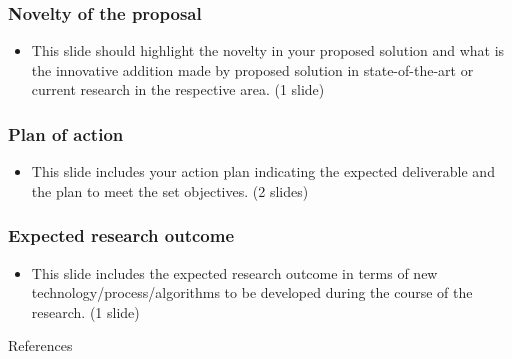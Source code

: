 \documentclass{beamer}
\begin{document}
\begin{frame}\frametitle{Novelty of the proposal}
\begin{itemize}
\item This slide should highlight the novelty in your proposed solution and what is the innovative addition made by proposed solution in state-of-the-art or current research in the respective area. (1 slide)
\end{itemize}
\end{frame}

\begin{frame}\frametitle{Plan of action}
\begin{itemize}
\item This slide includes your action plan indicating the expected deliverable and the plan to meet the set objectives. (2 slides)
\end{itemize}
\end{frame}

\begin{frame}\frametitle{Expected research outcome}
\begin{itemize}
\item This slide includes the expected research outcome in terms of new technology/process/algorithms to be developed during the course of the research. (1 slide)
\end{itemize}
\end{frame}



\begin{frame}[allowframebreaks]{References}

\nocite{*}
\end{frame}
\end{document}
